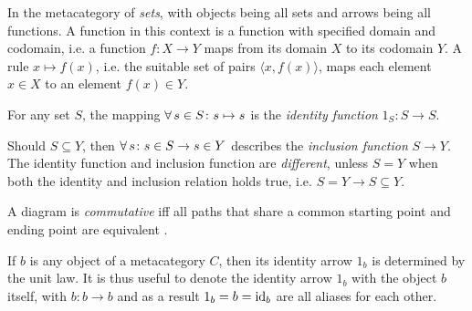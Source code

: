 \begin{example}
    In the metacategory of \textit{sets}, with objects being all sets and arrows being all functions. A function in this context is a function with specified domain and codomain, i.e. a function $f \colon X \to Y$ maps from its domain $X$ to its codomain $Y$. A rule $x \mapsto f(x)$, i.e. the suitable set of pairs $\langle x, f(x) \rangle$, maps each element $x \in X$ to an element $f(x) \in Y$.
    
    For any set $S$, the mapping $\operatorname{\forall} s \in S \colon s \mapsto s$ is the \textit{identity function} $1_S \colon S \to S$.
    
    Should $S \subseteq Y$, then $\operatorname{\forall} s \colon s \in S \to s \in Y$ describes the \textit{inclusion function} $S \to Y$. The identity function and inclusion function are \textit{different}, unless $S = Y$ when both the identity and inclusion relation holds true, i.e. $S = Y \to S \subseteq Y$.
\end{example}

\begin{definition}
    A diagram is \textit{commutative} iff all paths that share a common starting point and ending point are equivalent \cite{commutative-diagrams}.
\end{definition}

\begin{remark}
    If $b$ is any object of a metacategory $C$, then its identity arrow $1_b$ is determined by the unit law. It is thus useful to denote the identity arrow $1_b$ with the object $b$ itself, with $b \colon b \to b$ and as a result $1_b = b = \mathrm{id}_b$ are all aliases for each other.
\end{remark}

